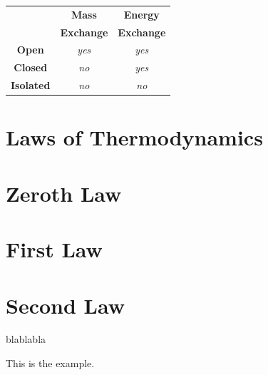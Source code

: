       \begin{tabular}{|c|c|c|}
         \hline
                      & {\bf Mass} & {\bf Energy} \\
                      & {\bf Exchange} & {\bf Exchange} \\
         \hline
         {\bf Open}   & {\it yes}  & {\it yes}    \\
         {\bf Closed} & {\it no}   & {\it yes}    \\
         {\bf Isolated}&{\it no}   & {\it no}     \\
         \hline 
      \end{tabular}    

\section{Laws of Thermodynamics}\label{Chapter:Introduction:Section:LawsThermodynamics}

\section{Zeroth Law}\label{zeroth_law}



\section{First Law}\label{first_law}


\section{Second Law}\label{second_law}





blablabla \cite{batchelor_1967} \cite{SmithVanNess_Book}

\begin{exmp}
This is the example.
\end{exmp}
%
